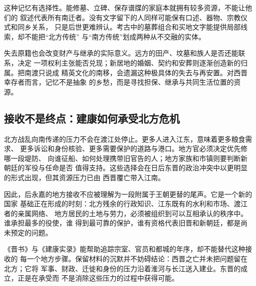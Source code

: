 这种记忆有选择性。能修墓、立碑、保存谱牒的家庭本就拥有较多资源，不能让他们的
叙述代表所有南迁者。没有文字留下的人同样可能保有口述、器物、宗教仪式和同乡关系，
只是后世更难辨认。考古中的墓葬组合和买地文字能提供局部线索，却不能把“北方传统”
与“南方传统”划成两种从不交融的实体。

失去原籍也会改变财产与继承的实际意义。远方的田产、坟墓和族人是否还能联系，决定
一项权利主张能否兑现；新居地的婚姻、契约和安葬则逐渐创造新的归属。把南渡只说成
精英文化的南移，会遗漏这种极具体的失去与再安置。对西晋幸存者而言，记忆不是抽象
的乡愁，而是寻找担保、继承与共同生活位置的资源。

\subsection{接收不是终点：建康如何承受北方危机}

北方战乱向南传递的压力不会在渡江处停止。更多人进入江东，意味着更多粮食需求、
更多诉讼和身份核验、更多需要保护的道路与港口。地方官必须决定优先修哪一段堤防、
向谁征船、如何处理携带旧官告的人；地方家族和市镇则要判断新朝廷的军役与任命是否
值得支持。这些选择会在日后东晋的政治冲突中以更明显的形式出现，但其资源压力已由
西晋覆亡带入江南。

因此，后永嘉的地方接收不应被理解为一段附属于王朝更替的尾声。它是一个新的国家
基础正在形成的时刻：北方残余的行政知识、江东既有的水利和市场、渡江者的亲属网络、
地方居民的土地与劳力，必须被组织到可以互相承认的秩序中。谁承担最多的役使，谁
得到最可靠的保护，谁有资格代表旧晋和新朝廷，都是尚未预定的问题。

《晋书》与《建康实录》能帮助追踪宗室、官员和都城的年序，却不能替代这种接收的
每一个地方步骤。保留材料的沉默并不妨碍结论：西晋之亡并未把问题留在北方；它将
军事、财政、迁徙和身份的压力沿着淮河与长江送入建业。东晋的成立，正是在承受而
不是消除这些压力的过程中获得可能。